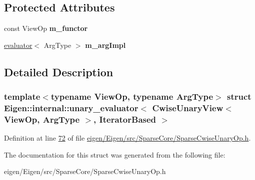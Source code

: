 \subsection*{Protected Attributes}
\begin{DoxyCompactItemize}
\item 
\mbox{\label{struct_eigen_1_1internal_1_1unary__evaluator_3_01_cwise_unary_view_3_01_view_op_00_01_arg_type_01_4_00_01_iterator_based_01_4_a6fb281b3edf00e5292504f2e7562c764}} 
const View\+Op {\bfseries m\+\_\+functor}
\item 
\mbox{\label{struct_eigen_1_1internal_1_1unary__evaluator_3_01_cwise_unary_view_3_01_view_op_00_01_arg_type_01_4_00_01_iterator_based_01_4_aff69a10719aa719b025badc174b97d55}} 
\hyperlink{struct_eigen_1_1internal_1_1evaluator}{evaluator}$<$ Arg\+Type $>$ {\bfseries m\+\_\+arg\+Impl}
\end{DoxyCompactItemize}


\subsection{Detailed Description}
\subsubsection*{template$<$typename View\+Op, typename Arg\+Type$>$\newline
struct Eigen\+::internal\+::unary\+\_\+evaluator$<$ Cwise\+Unary\+View$<$ View\+Op, Arg\+Type $>$, Iterator\+Based $>$}



Definition at line \hyperlink{eigen_2_eigen_2src_2_sparse_core_2_sparse_cwise_unary_op_8h_source_l00072}{72} of file \hyperlink{eigen_2_eigen_2src_2_sparse_core_2_sparse_cwise_unary_op_8h_source}{eigen/\+Eigen/src/\+Sparse\+Core/\+Sparse\+Cwise\+Unary\+Op.\+h}.



The documentation for this struct was generated from the following file\+:\begin{DoxyCompactItemize}
\item 
eigen/\+Eigen/src/\+Sparse\+Core/\+Sparse\+Cwise\+Unary\+Op.\+h\end{DoxyCompactItemize}
